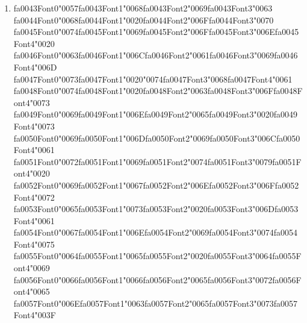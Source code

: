 \documentclass[12pt]{article}
\begin{document}
\begin{enumerate}[label=Q\arabic*.]
 \item {\csname fa0043Font0\endcsname\char"0057}{\csname fa0043Font1\endcsname\char"0068}{\csname fa0043Font2\endcsname\char"0069}{\csname fa0043Font3\endcsname\char"0063} {\csname fa0044Font0\endcsname\char"0068}{\csname fa0044Font1\endcsname\char"0020}{\csname fa0044Font2\endcsname\char"006F}{\csname fa0044Font3\endcsname\char"0070} {\csname fa0045Font0\endcsname\char"0074}{\csname fa0045Font1\endcsname\char"0069}{\csname fa0045Font2\endcsname\char"006F}{\csname fa0045Font3\endcsname\char"006E}{\csname fa0045Font4\endcsname\char"0020} {\csname fa0046Font0\endcsname\char"0063}{\csname fa0046Font1\endcsname\char"006C}{\csname fa0046Font2\endcsname\char"0061}{\csname fa0046Font3\endcsname\char"0069}{\csname fa0046Font4\endcsname\char"006D} {\csname fa0047Font0\endcsname\char"0073}{\csname fa0047Font1\endcsname\char"0020}{\char"0074}{\csname fa0047Font3\endcsname\char"0068}{\csname fa0047Font4\endcsname\char"0061} {\csname fa0048Font0\endcsname\char"0074}{\csname fa0048Font1\endcsname\char"0020}{\csname fa0048Font2\endcsname\char"0063}{\csname fa0048Font3\endcsname\char"006F}{\csname fa0048Font4\endcsname\char"0073} {\csname fa0049Font0\endcsname\char"0069}{\csname fa0049Font1\endcsname\char"006E}{\csname fa0049Font2\endcsname\char"0065}{\csname fa0049Font3\endcsname\char"0020}{\csname fa0049Font4\endcsname\char"0073} {\csname fa0050Font0\endcsname\char"0069}{\csname fa0050Font1\endcsname\char"006D}{\csname fa0050Font2\endcsname\char"0069}{\csname fa0050Font3\endcsname\char"006C}{\csname fa0050Font4\endcsname\char"0061} {\csname fa0051Font0\endcsname\char"0072}{\csname fa0051Font1\endcsname\char"0069}{\csname fa0051Font2\endcsname\char"0074}{\csname fa0051Font3\endcsname\char"0079}{\csname fa0051Font4\endcsname\char"0020} {\csname fa0052Font0\endcsname\char"0069}{\csname fa0052Font1\endcsname\char"0067}{\csname fa0052Font2\endcsname\char"006E}{\csname fa0052Font3\endcsname\char"006F}{\csname fa0052Font4\endcsname\char"0072} {\csname fa0053Font0\endcsname\char"0065}{\csname fa0053Font1\endcsname\char"0073}{\csname fa0053Font2\endcsname\char"0020}{\csname fa0053Font3\endcsname\char"006D}{\csname fa0053Font4\endcsname\char"0061} {\csname fa0054Font0\endcsname\char"0067}{\csname fa0054Font1\endcsname\char"006E}{\csname fa0054Font2\endcsname\char"0069}{\csname fa0054Font3\endcsname\char"0074}{\csname fa0054Font4\endcsname\char"0075} {\csname fa0055Font0\endcsname\char"0064}{\csname fa0055Font1\endcsname\char"0065}{\csname fa0055Font2\endcsname\char"0020}{\csname fa0055Font3\endcsname\char"0064}{\csname fa0055Font4\endcsname\char"0069} {\csname fa0056Font0\endcsname\char"0066}{\csname fa0056Font1\endcsname\char"0066}{\csname fa0056Font2\endcsname\char"0065}{\csname fa0056Font3\endcsname\char"0072}{\csname fa0056Font4\endcsname\char"0065} {\csname fa0057Font0\endcsname\char"006E}{\csname fa0057Font1\endcsname\char"0063}{\csname fa0057Font2\endcsname\char"0065}{\csname fa0057Font3\endcsname\char"0073}{\csname fa0057Font4\endcsname\char"003F}

\end{enumerate}
\end{document}
